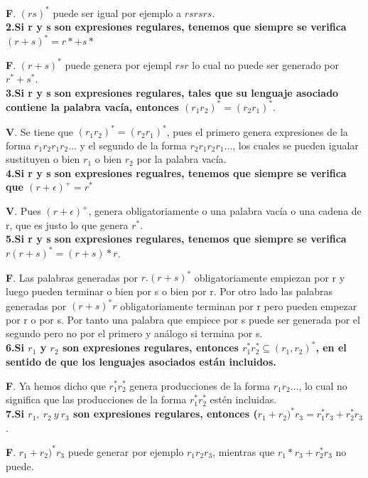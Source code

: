 \documentclass[a4paper,11pt]{article}
\begin{document}
\textbf{F}. $(rs)^*$ puede ser igual por ejemplo a $rsrsrs$. \\

\textbf{2.Si r y s son expresiones regulares, tenemos que siempre se verifica $(r+s)^*=r*+s*$}

\textbf{F}. $(r+s)^*$ puede genera por ejempl $rsr$ lo cual no puede ser generado por $r^*+s^*$. \\

\textbf{3.Si r y s son expresiones regulares, tales que su lenguaje asociado contiene la palabra vacía, entonces $(r_1r_2)^*=(r_2r_1)^*$}.

\textbf{V}. Se tiene que $(r_1r_2)^*=(r_2r_1)^*$, pues el primero genera expresiones de la forma $r_1r_2r_1r_2\ldots$ y el segundo de la forma $r_2r_1r_2r_1\ldots$, los cuales se pueden igualar sustituyen o bien $r_1$ o bien $r_2$ por la palabra vacía. \\

\textbf{4.Si r y s son expresiones regualres, tenemos que siempre se verifica que $(r+\epsilon)^+=r^*$}

\textbf{V}. Pues $(r+\epsilon)^+$, genera obligatoriamente o una palabra vacía o una cadena de r, que es justo lo que genera $r^*$.  \\

\textbf{5.Si r y s son expresiones regulares, tenemos que siempre se verifica $r(r+s)^*=(r+s)*r$}.

\textbf{F}. Las palabras generadas por $r.(r+s)^*$ obligatoriamente empiezan por r y luego pueden terminar o bien por s o bien por r. Por otro lado las palabras generadas por $(r+s)^*r$ obligatoriamente terminan por r pero pueden empezar por r o por s. Por tanto una palabra que empiece por s puede ser generada por el segundo pero no por el primero y análogo si termina por s. \\

\textbf{6.Si $r_1$ y $r_2$ son expresiones regulares, entonces $r_1^*r_2^* \subseteq (r_1,r_2)^*$, en el sentido de que los lenguajes asociados están incluidos.}

\textbf{F}. Ya hemos dicho que $r_1^*r_2^*$ genera producciones de la forma $r_1r_2\ldots$, lo cual no significa que las producciones de la forma $r_1^*r_2^*$ estén incluidas. \\

\textbf{7.Si $r_1,\> r_2 \> y \> r_3$ son expresiones regulares, entonces ($r_1+r_2)^*r_3=r_1^*r_3+r_2^*r_3$}.

\textbf{F}. $r_1+r_2)^*r_3$ puede generar por ejemplo $r_1r_2r_3$, mientras que $r_1*r_3+r_2^*r_3$ no puede. \\
\end{document}
